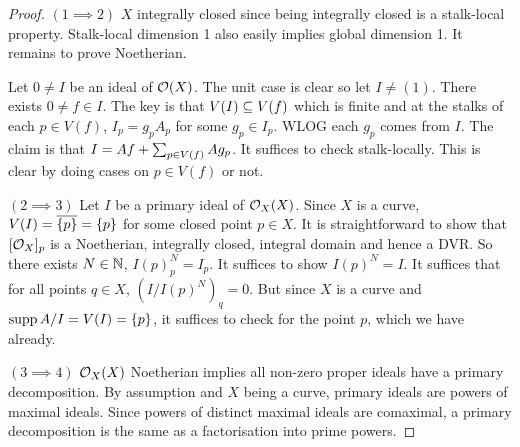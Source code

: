 \documentclass[./main.tex]{subfiles}
\begin{document}
\begin{proof}
  $(1\implies 2)$ 
  $X$ integrally closed since being integrally closed is a stalk-local property.
  Stalk-local dimension 1 also easily implies global dimension 1. 
  It remains to prove Noetherian. 

  Let $0 \neq I$ be an ideal of $\mathcal{O}(X)$.
  The unit case is clear so let $I \neq (1)$.
  There exists $0 \neq f \in I$. 
  The key is that $V(I) \subseteq V(f)$ which is finite and 
  at the stalks of each $p \in V(f)$, $I_p = g_p A_p$ for some $g_p \in I_p$.
  WLOG each $g_p$ comes from $I$. 
  The claim is that $I = Af + \sum_{p \in V(f)}^{} Ag_p$.
  It suffices to check stalk-locally.
  This is clear by doing cases on $p \in V(f)$ or not. 

  $(2 \implies 3)$ 
  Let $I$ be a primary ideal of $\mathcal{O}_X(X)$.
  Since $X$ is a curve, 
  $V(I) = \overline{\left\{p\right\}} = \left\{p\right\}$ for some closed point $p \in X$.
  It is straightforward to show that $[\mathcal{O}_X]_p$ is a Noetherian, 
  integrally closed, integral domain and hence a DVR.
  So there exists $N \in \mathbb{N}$, $I(p)^N_p = I_p$.
  It suffices to show $I(p)^N = I$.
  It suffices that for all points $q \in X$, $(I/I(p)^N)_q = 0$. 
  But since $X$ is a curve and $\operatorname{supp} A/I = V(I) = \left\{p\right\}$, 
  it suffices to check for the point $p$, which we have already. 

  $(3 \implies 4)$
  $\mathcal{O}_X(X)$ Noetherian implies all non-zero proper ideals 
  have a primary decomposition. 
  By assumption and $X$ being a curve, 
  primary ideals are powers of maximal ideals. 
  Since powers of distinct maximal ideals are comaximal, 
  a primary decomposition is the same as a factorisation into prime powers.


\end{proof}
\end{document}
